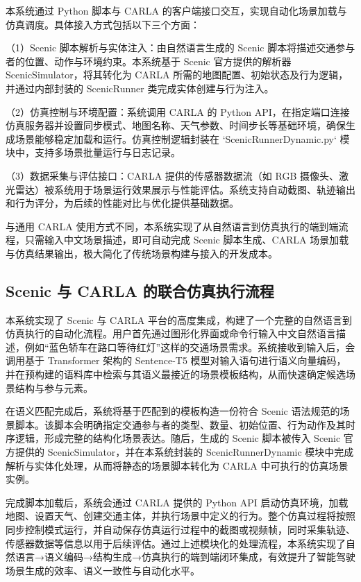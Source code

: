 本系统通过 Python 脚本与 CARLA 的客户端接口交互，实现自动化场景加载与仿真调度。具体接入方式包括以下三个方面：


（1）Scenic 脚本解析与实体注入：由自然语言生成的 Scenic 脚本将描述交通参与者的位置、动作与环境约束。本系统基于 Scenic 官方提供的解析器 ScenicSimulator，将其转化为 CARLA 所需的地图配置、初始状态及行为逻辑，并通过内部封装的 ScenicRunner 类完成实体创建与行为注入。

（2）仿真控制与环境配置：系统调用 CARLA 的 Python API，在指定端口连接仿真服务器并设置同步模式、地图名称、天气参数、时间步长等基础环境，确保生成场景能够稳定加载和运行。仿真控制逻辑封装在 `ScenicRunnerDynamic.py` 模块中，支持多场景批量运行与日志记录。

（3）数据采集与评估接口：CARLA 提供的传感器数据流（如 RGB 摄像头、激光雷达）被系统用于场景运行效果展示与性能评估。系统支持自动截图、轨迹输出和行为评分，为后续的性能对比与优化提供基础数据。

与通用 CARLA 使用方式不同，本系统实现了从自然语言到仿真执行的端到端流程，只需输入中文场景描述，即可自动完成 Scenic 脚本生成、CARLA 场景加载与仿真结果输出，极大简化了传统场景构建与接入的开发成本。


\subsection{Scenic 与 CARLA 的联合仿真执行流程}

本系统实现了 Scenic 与 CARLA 平台的高度集成，构建了一个完整的自然语言到仿真执行的自动化流程。用户首先通过图形化界面或命令行输入中文自然语言描述，例如“蓝色轿车在路口等待红灯”这样的交通场景需求。系统接收到输入后，会调用基于 Transformer 架构的 Sentence-T5 模型对输入语句进行语义向量编码，并在预构建的语料库中检索与其语义最接近的场景模板结构，从而快速确定候选场景结构与参与元素。

在语义匹配完成后，系统将基于匹配到的模板构造一份符合 Scenic 语法规范的场景脚本。该脚本会明确指定交通参与者的类型、数量、初始位置、行为动作及其时序逻辑，形成完整的结构化场景表达。随后，生成的 Scenic 脚本被传入 Scenic 官方提供的 ScenicSimulator，并在本系统封装的 ScenicRunnerDynamic 模块中完成解析与实体化处理，从而将静态的场景脚本转化为 CARLA 中可执行的仿真场景实例。

完成脚本加载后，系统会通过 CARLA 提供的 Python API 启动仿真环境，加载地图、设置天气、创建交通主体，并执行场景中定义的行为。整个仿真过程将按照同步控制模式运行，并自动保存仿真运行过程中的截图或视频帧，同时采集轨迹、传感器数据等信息以用于后续评估。通过上述模块化的处理流程，本系统实现了自然语言→语义编码→结构生成→仿真执行的端到端闭环集成，有效提升了智能驾驶场景生成的效率、语义一致性与自动化水平。



